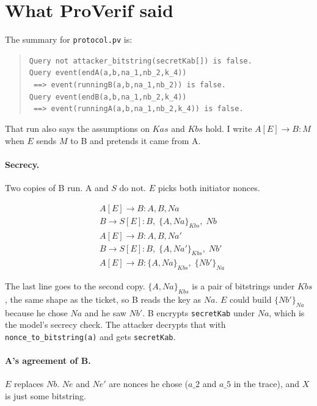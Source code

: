 \documentclass[11pt]{article}
\newcommand{\enc}[2]{\{#1\}_{#2}}
\begin{document}
\section{What ProVerif said}

The summary for \texttt{protocol.pv} is:

\begin{quote}\raggedright\small
\texttt{Query not attacker\_bitstring(secretKab[]) is false.}\\[0.3em]
\texttt{Query event(endA(a,b,na\_1,nb\_2,k\_4))}\\
\texttt{\ ==> event(runningB(a,b,na\_1,nb\_2)) is false.}\\[0.3em]
\texttt{Query event(endB(a,b,na\_1,nb\_2,k\_4))}\\
\texttt{\ ==> event(runningA(a,b,na\_1,nb\_2,k\_4)) is false.}
\end{quote}

That run also says the assumptions on $Kas$ and $Kbs$ hold. I write $A[E] \rightarrow B : M$ when $E$ sends $M$ to B and pretends it came from A.

\paragraph{Secrecy.}
Two copies of B run. A and $S$ do not. $E$ picks both initiator nonces.

\begin{align*}
&A[E] \rightarrow B : A, B, Na \\
&B \rightarrow S[E] : B,\; \enc{A, Na}{Kbs},\; Nb \\
&A[E] \rightarrow B : A, B, Na' \\
&B \rightarrow S[E] : B,\; \enc{A, Na'}{Kbs},\; Nb' \\
&A[E] \rightarrow B : \enc{A, Na}{Kbs},\; \enc{Nb'}{Na}
\end{align*}

The last line goes to the second copy. $\enc{A, Na}{Kbs}$ is a pair of bitstrings under $Kbs$, the same shape as the ticket, so B reads the key as $Na$. $E$ could build $\enc{Nb'}{Na}$ because he chose $Na$ and he saw $Nb'$. B encrypts \texttt{secretKab} under $Na$, which is the model's secrecy check. The attacker decrypts that with \texttt{nonce\_to\_bitstring(a)} and gets \texttt{secretKab}.

\paragraph{A's agreement of B.}
$E$ replaces $Nb$. $Ne$ and $Ne'$ are nonces he chose ($a\_2$ and $a\_5$ in the trace), and $X$ is just some bitstring.
\end{document}

